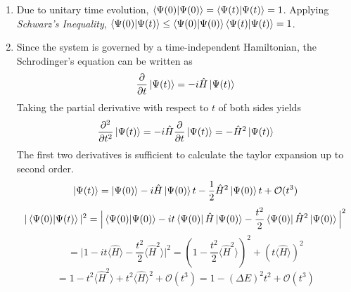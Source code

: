 \begin{sol}
\begin{enumerate}[label=\textbf{(\alph*)}]
\item
Due to unitary time evolution, $\braket{\Psi(0)}{\Psi(0)}=\braket{\Psi(t)}{\Psi(t)}=1$. Applying \textit{Schwarz's Inequality}, $\braket{\Psi(0)}{\Psi(t)}\leq\braket{\Psi(0)}{\Psi(0)}\braket{\Psi(t)}{\Psi(t)}=1$. 
\item
Since the system is governed by a time-independent Hamiltonian, the Schrodinger's equation can be written as
\begin{equation}
	\frac{\partial}{\partial t}\ket {\Psi(t)}=-i\hat H\ket{\Psi(t)}
\end{equation}
Taking the partial derivative with respect to $t$ of both sides yields
\begin{equation}
	\frac{\partial^2}{\partial t^2}\ket{\Psi(t)}=-i\hat H\frac{\partial}{\partial t}\ket{\Psi(t)}=-\hat H^2\ket{\Psi(t)}
\end{equation}
The first two derivatives is sufficient to calculate the taylor expansion up to second order.
\begin{equation}
	\ket{\Psi(t)}=\ket{\Psi(0)}-i\hat H\ket{\Psi(0)}t-\frac{1}{2}\hat H^2\ket{\Psi(0)}t+\mathcal O(t^3)
\end{equation}
\begin{equation}
	|\braket{\Psi(0)}{\Psi(t)}|^2=\Big|\braket{\Psi(0)}{\Psi(0)}-it\bra{\Psi(0)}\hat H\ket{\Psi(0)}-\frac{t^2}{2}\bra{\Psi(0)}\hat H^2\ket{\Psi(0)}\Big|^2
\end{equation}
\begin{equation}
	=\Big|1-it\langle\hat H\rangle-\frac{t^2}{2}\langle \hat H^2\rangle\Big|^2=\left(1-\frac{t^2}{2}\langle \hat H^2\rangle\right)^2+(t\langle\hat H\rangle)^2
\end{equation}\begin{equation}
	=1-t^2\langle \hat H^2\rangle+t^2\langle\hat H\rangle^2+\mathcal{O}(t^3)=1-(\Delta E)^2t^2+\mathcal{O}(t^3)
\end{equation}
\end{enumerate}
\end{sol}